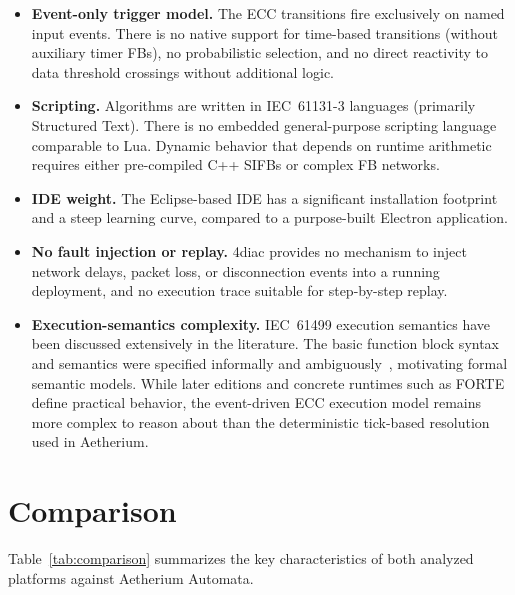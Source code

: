 \begin{itemize}
  \item \textbf{Event-only trigger model.} The ECC transitions fire exclusively on named input events. There is no native support for time-based transitions (without auxiliary timer FBs), no probabilistic selection, and no direct reactivity to data threshold crossings without additional logic.
  \item \textbf{Scripting.} Algorithms are written in IEC~61131-3 languages (primarily Structured Text). There is no embedded general-purpose scripting language comparable to Lua. Dynamic behavior that depends on runtime arithmetic requires either pre-compiled C++ SIFBs or complex FB networks.
  \item \textbf{IDE weight.} The Eclipse-based IDE has a significant installation footprint and a steep learning curve, compared to a purpose-built Electron application.
  \item \textbf{No fault injection or replay.} 4diac provides no mechanism to inject network delays, packet loss, or disconnection events into a running deployment, and no execution trace suitable for step-by-step replay.
  \item \textbf{Execution-semantics complexity.} IEC~61499 execution semantics have been discussed extensively in the literature. The basic function block syntax and semantics were specified informally and ambiguously~\cite{Tu2012}, motivating formal semantic models. While later editions and concrete runtimes such as FORTE define practical behavior, the event-driven ECC execution model remains more complex to reason about than the deterministic tick-based resolution used in Aetherium.
\end{itemize}

\section{Comparison}
\label{sec:comparison}

Table~\ref{tab:comparison} summarizes the key characteristics of both analyzed platforms against Aetherium Automata.

